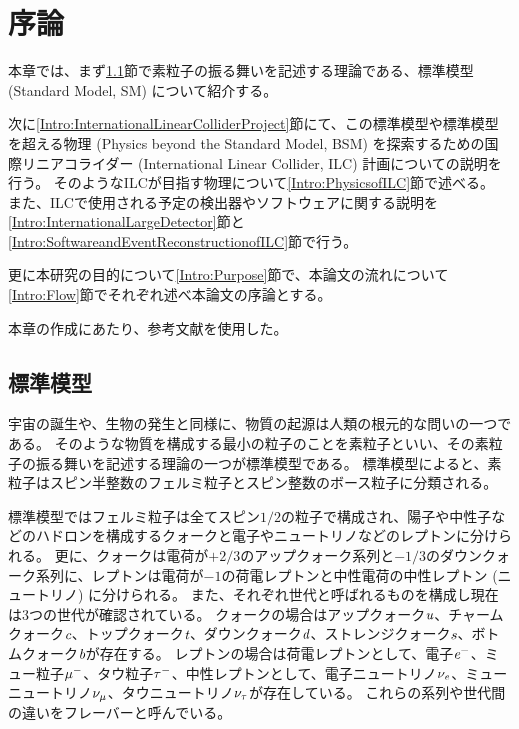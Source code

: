 
\chapter{序論} \label{chap:Introduction}

本章では、まず\ref{Intro:StandardModel}節で素粒子の振る舞いを記述する理論である、標準模型 (Standard Model, SM) について紹介する。

次に\ref{Intro:InternationalLinearColliderProject}節にて、この標準模型や標準模型を超える物理 (Physics beyond the Standard Model, BSM) を探索するための国際リニアコライダー (International Linear Collider, ILC) 計画についての説明を行う。
そのようなILCが目指す物理について\ref{Intro:PhysicsofILC}節で述べる。
また、ILCで使用される予定の検出器やソフトウェアに関する説明を\ref{Intro:InternationalLargeDetector}節と\ref{Intro:SoftwareandEventReconstructionofILC}節で行う。

更に本研究の目的について\ref{Intro:Purpose}節で、本論文の流れについて\ref{Intro:Flow}節でそれぞれ述べ本論文の序論とする。

本章の作成にあたり、参考文献\cite{GlobalProject, InterimDesignReport}を使用した。


\section{標準模型} \label{Intro:StandardModel}

宇宙の誕生や、生物の発生と同様に、物質の起源は人類の根元的な問いの一つである。
そのような物質を構成する最小の粒子のことを素粒子といい、その素粒子の振る舞いを記述する理論の一つが標準模型である。
標準模型によると、素粒子はスピン半整数のフェルミ粒子とスピン整数のボース粒子に分類される。

標準模型ではフェルミ粒子は全てスピン$1/2$の粒子で構成され、陽子や中性子などのハドロンを構成するクォークと電子やニュートリノなどのレプトンに分けられる。
更に、クォークは電荷が$+2/3$のアップクォーク系列と$-1/3$のダウンクォーク系列に、レプトンは電荷が$-1$の荷電レプトンと中性電荷の中性レプトン (ニュートリノ) に分けられる。
また、それぞれ世代と呼ばれるものを構成し現在は3つの世代が確認されている。
クォークの場合はアップクォーク$\textit u$、チャームクォーク$\textit c$、トップクォーク$\textit t$、ダウンクォーク$\textit d$、ストレンジクォーク$\textit s$、ボトムクォーク$\textit b$が存在する。
レプトンの場合は荷電レプトンとして、電子$\textit e^-$、ミュー粒子$\it \mu^-$、タウ粒子$\it \tau^-$、中性レプトンとして、電子ニュートリノ$\it \nu_e$、ミューニュートリノ$\it \nu_{\mu}$、タウニュートリノ$\it \nu_{\tau}$が存在している。
これらの系列や世代間の違いをフレーバーと呼んでいる。

